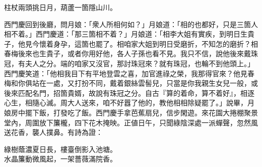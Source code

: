 \begin{myquote}
柱杖兩頭挑日月，葫蘆一箇隱山川。
\end{myquote}

西門慶回到後廳，問月娘：「衆人所相何如？」月娘道：「相的也都好，只是三箇人相不着。」西門慶道：「那三箇相不着？」月娘道：「相李大姐有實疾，到明日生貴子，他見今懷着身孕，這箇也罷了。相咱家大姐到明日受磨折，不知怎的磨折？相春梅後來也生貴子，或者你用好他，各人子孫也看不見。我只不信，說他後來戴珠冠，有夫人之分。端的咱家又沒官，那討珠冠來？就有珠冠，也輪不到他頭上。」西門慶笑道：「他相我目下有平地登雲之喜，加官進祿之榮，我那得官來？他見春梅和你俱站在一處，又打扮不同，戴着銀絲雲髻兒，只當是你我親生女兒一般，或後來匹配名門，招箇貴婿，故說有珠冠之分。{}自古『算的着命，算不着好』，相逐心生，相隨心滅。周大人送來，咱不好囂了他的，教他相相除疑罷了。」說畢，月娘房中擺下飯，打發吃了飯。西門慶手拿芭蕉扇兒，信步閑遊。來花園大捲棚聚景堂內，周圍放下簾櫳，四下花木掩映。正値日午，只聞綠陰深處一派蟬聲，忽然風送花香，襲人撲鼻。有詩為證：

\begin{myquote}
綠樹蔭濃夏日長，樓臺倒影入池塘。\\水晶簾動微風起，一架薔薇滿院香。
\end{myquote}

